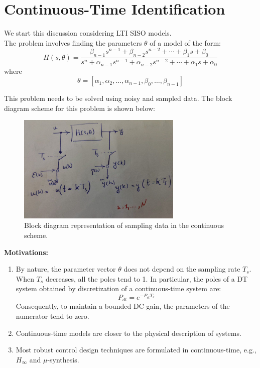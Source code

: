 \chapter{Continuous-Time Identification}

We start this discussion considering LTI SISO models.\\

The problem involves finding the parameters \(\theta\) of a model of the form:
\[
H(s, \theta) = \frac{\beta_{n-1}s^{n-1} + \beta_{n-2}s^{n-2} + \cdots + \beta_1s + \beta_0}{s^n + \alpha_{n-1}s^{n-1} + \alpha_{n-2}s^{n-2} + \cdots + \alpha_1s + \alpha_0}
\]
where
\[
\theta = [\alpha_1, \alpha_2, \ldots, \alpha_{n-1}, \beta_0, \ldots, \beta_{n-1}]
\]

This problem needs to be solved using noisy and sampled data. The block diagram scheme for this problem is shown below:

\begin{figure}[htbp]
    \centering
    \includegraphics[width=0.7\textwidth]{images/continuous-scheme.jpg}
    \caption{Block diagram representation of sampling data in the continuous scheme.}
    \label{fig:signal-and-noise}
\end{figure}

\textbf{Motivations:}
\begin{enumerate}
    \item By nature, the parameter vector \(\theta\) does not depend on the sampling rate \(T_s\).\\
    When \(T_s\) decreases, all the poles tend to 1. In particular, the poles of a DT system obtained by discretization of a continuous-time system are:
    \[
    P_{dt} = e^{-P_{ct}T_s}
    \]
    Consequently, to maintain a bounded DC gain, the parameters of the numerator tend to zero.

    \item Continuous-time models are closer to the physical description of systems.

    \item Most robust control design techniques are formulated in continuous-time, e.g., \(H_\infty\) and \(\mu\)-synthesis.
\end{enumerate}

